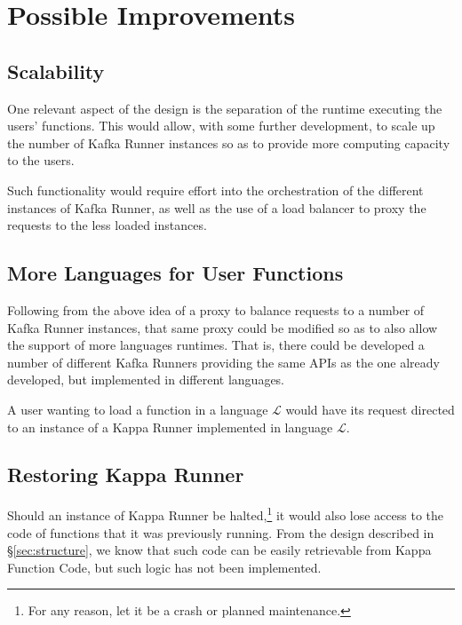 \documentclass[a4paper]{ifacconf}
\begin{document}
    \section{Possible Improvements}\label{sec:improvements}
    
    \subsection{Scalability}
    One relevant aspect of the design is the separation of the runtime executing the users' functions.
    This would allow, with some further development, to scale up the number of Kafka Runner instances so as to provide more computing capacity to the users.
    
    Such functionality would require effort into the orchestration of the different instances of Kafka Runner, as well as the use of a load balancer to proxy the requests to the less loaded instances.
    
    \subsection{More Languages for User Functions}
    
    Following from the above idea of a proxy to balance requests to a number of Kafka Runner instances, that same proxy could be modified so as to also allow the support of more languages runtimes.
    That is, there could be developed a number of different Kafka Runners providing the same APIs as the one already developed, but implemented in different languages.
    
    A user wanting to load a function in a language $\mathcal{L}$ would have its request directed to an instance of a Kappa Runner implemented in language $\mathcal{L}$.
    
    \subsection{Restoring Kappa Runner}
    
    Should an instance of Kappa Runner be halted,\footnote{
        For any reason, let it be a crash or planned maintenance.
    } it would also lose access to the code of functions that it was previously running.
    From the design described in \S\ref{sec:structure}, we know that such code can be easily retrievable from Kappa Function Code, but such logic has not been implemented.
    
\end{document}
